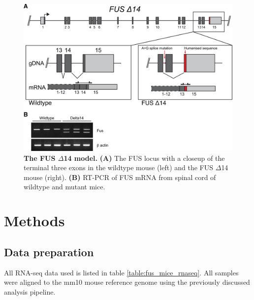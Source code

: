 \begin{figure}[h!]
	\begin{center}
		\includegraphics[width=\textwidth]{Figures/04_fus_mice/anny_FUS_schematic.png}
	\end{center}
	\caption[The FUS $\Delta$14 model]{
		\textbf{The FUS $\Delta$14 model.}
		\textbf{(A)} The FUS locus with a closeup of the terminal three exons in the wildtype mouse (left) and the FUS $\Delta$14 mouse (right). 
		\textbf{(B)} RT-PCR of FUS mRNA from spinal cord of wildtype and mutant mice.
	}
		\label{fig:delta14_structure}
\end{figure}


\section{Methods}

\subsection{Data preparation}
All RNA-seq data used is listed in table \ref{table:fus_mice_rnaseq}. All samples were aligned to the mm10 mouse reference genome using the previously discussed analysis pipeline.


